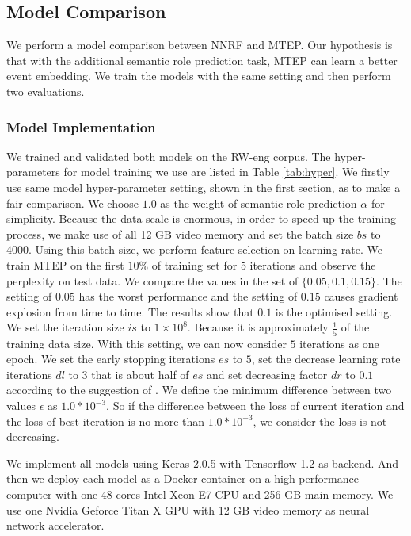 \documentclass[a4paper]{article}
\begin{document}
\subsection{Model Comparison} 
We perform a model comparison between NNRF and MTEP. Our hypothesis is that with the additional semantic role prediction task, MTEP can learn a better event embedding. We train the models with the same setting and then perform two evaluations.

\subsubsection{Model Implementation} \label{sec:mtep-implementation}
We trained and validated both models on the RW-eng corpus. The hyper-parameters for model training we use are listed in Table \ref{tab:hyper}. We firstly use same model hyper-parameter setting, shown in the first section, as \citet{tilk2016event} to make a fair comparison. We choose $1.0$ as the weight of semantic role prediction $\alpha$ for simplicity. Because the data scale is enormous, in order to speed-up the training process, we make use of all 12 GB video memory and set the batch size $bs$ to $4000$. Using this batch size, we perform feature selection on learning rate. We train MTEP on the first $10\%$ of training set for $5$ iterations and observe the perplexity on test data. We compare the values in the set of $\{0.05, 0.1, 0.15\}$. The setting of $0.05$ has the worst performance and the setting of $0.15$ causes gradient explosion from time to time. The results show that $0.1$ is the optimised setting. We set the iteration size $is$ to $1 \times 10^8$. Because it is approximately $\frac{1}{5}$ of the training data size. With this setting, we can now consider $5$ iterations as one epoch. We set the early stopping iterations $es$ to $5$, set the decrease learning rate iterations $dl$ to $3$ that is about half of $es$ and set decreasing factor $dr$ to $0.1$ according to the suggestion of \citet{he2016deep}. We define the minimum difference between two values $\epsilon$ as $1.0*10^{-3}$. So if the difference between the loss of current iteration and the loss of best iteration is no more than $1.0*10^{-3}$, we consider the loss is not decreasing. 

We implement all models using Keras 2.0.5 \citep{chollet2015keras} with Tensorflow 1.2 \citep{abadi2016tensorflow} as backend. And then we deploy each model as a Docker container on a high performance computer with one 48 cores Intel Xeon E7 CPU and 256 GB main memory. We use one Nvidia Geforce Titan X GPU with 12 GB video memory as neural network accelerator. 
\end{document}
